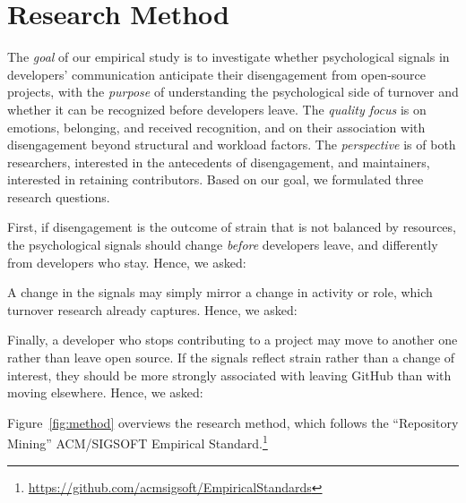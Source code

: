 \section{Research Method}
\label{sec:method}

The \textit{goal} of our empirical study is to investigate whether psychological signals in developers' communication anticipate their disengagement from open-source projects, with the \textit{purpose} of understanding the psychological side of turnover and whether it can be recognized before developers leave. The \textit{quality focus} is on emotions, belonging, and received recognition, and on their association with disengagement beyond structural and workload factors. The \textit{perspective} is of both researchers, interested in the antecedents of disengagement, and maintainers, interested in retaining contributors. Based on our goal, we formulated three research questions.

First, if disengagement is the outcome of strain that is not balanced by resources, the psychological signals should change \textit{before} developers leave, and differently from developers who stay. Hence, we asked:


A change in the signals may simply mirror a change in activity or role, which turnover research already captures. Hence, we asked:


Finally, a developer who stops contributing to a project may move to another one rather than leave open source. If the signals reflect strain rather than a change of interest, they should be more strongly associated with leaving GitHub than with moving elsewhere. Hence, we asked:


Figure~\ref{fig:method} overviews the research method, which follows the ``Repository Mining'' ACM/SIGSOFT Empirical Standard.\footnote{\url{https://github.com/acmsigsoft/EmpiricalStandards}}

